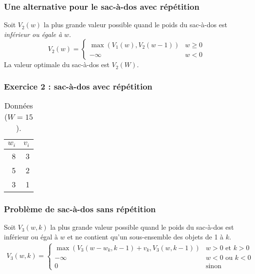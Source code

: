 \documentclass{beamer}
\begin{document}
\begin{frame}
  \frametitle{Une alternative pour le sac-à-dos avec répétition}
  Soit $V_2(w)$ la plus grande valeur possible quand le poids du sac-à-dos est \emph{inférieur ou égale à} $w$.
  \begin{equation*}
    V_2(w) =
    \begin{cases}
     \max (V_1(w), V_2(w-1)) & w \geq 0 \\
     - \infty & w < 0
    \end{cases}
  \end{equation*}
  La valeur optimale du sac-à-dos est $V_2(W)$.
\end{frame}


\begin{frame}
   \frametitle{Exercice 2 : sac-à-dos avec répétition}
  \begin{table}[h]
    \centering
    \begin{tabular}{r|r}
      \toprule
      $w_i$ & $v_i$ \\
      \midrule
      8 & 3\\
      5 & 2\\
      3 & 1\\
        \bottomrule
    \end{tabular}
    \caption{Données ($W=15$).}
  \end{table}
\end{frame}

\begin{frame}
  \frametitle{Problème de sac-à-dos sans répétition}
  Soit $V_3(w, k)$ la plus grande valeur possible quand le poids du sac-à-dos est inférieur ou égal à $w$ et ne contient qu'un sous-ensemble des objets de 1 à $k$.
  \begin{align*}
    V_3(w, k) =
    \begin{cases}
      \max ( V_3(w - w_k, k - 1) + v_k, V_3(w, k-1) ) & w > 0 \text{ et } k > 0\\
     - \infty & w < 0 \text{ ou } k < 0 \\
      0& \text{sinon}
    \end{cases}
  \end{align*}

\end{frame}
\end{document}
